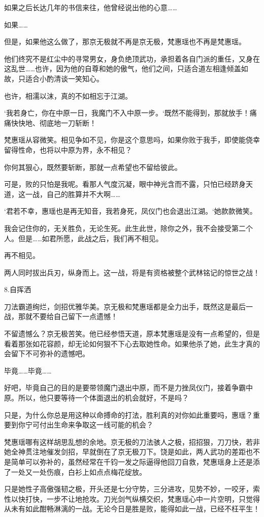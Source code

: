 如果之后长达几年的书信来往，他曾经说出他的心意……

如果……

但是，如果他这么做了，那京无极就不再是京无极，梵惠瑶也不再是梵惠瑶。

他们终究不是红尘中的寻常男女，身负绝顶武功，承担着各自门派的重任，又身在这乱世……也许，因为他的自尊和她的傲气，他们之间，只适合道左相逢倾盖如故，只适合小酌清谈一笑知心。

也许，相濡以沫，真的不如相忘于江湖。

‘我若身亡，你在中原一日，我魔门不入中原一步。‘既然不能得到，那就放手！痛痛快快地、彻底地一刀斩断！

梵惠瑶从容微笑。相见争如不见，你是这个意思吗，如果你败于我手，即使能侥幸留得性命，也将以中原为界，永不相见？

你何其狠心，既然要斩断，那就一点希望也不留给彼此。

可是，败的只怕是我呢。看那人气度沉凝，眼中神光含而不露，只怕已经跻身天道，这一战，自己的胜算并不大啊……

‘君若不幸，惠瑶也是再无知音，我若身死，凤仪门也会退出江湖。‘她款款微笑。

我会记住你的，无关胜负，无论生死。此生此世，除你之外，我不会接受第二个人。但是……如君所愿，此战之后，我们再不相见。

再不相见。

两人同时拔出兵刃，纵身而上。这一战，将是有资格被整个武林铭记的惊世之战！

8.自挥洒

刀法霸道绚烂，剑招优雅华美。京无极和梵惠瑶都是全力出手，既然这是最后一战，那就不要给自己留下一点遗憾！

不留遗憾么？京无极苦笑。他已经参悟天道，原本梵惠瑶是没有一点希望的，但是看着那张如花容颜，却无论如何狠不下心去取她性命。如果他杀了她，此生才真的会留下不可弥补的遗憾吧。

毕竟……毕竟……

好吧，毕竟自己的目的是要带领魔门退出中原，而不是力挫凤仪门，接着争霸中原。所以，他只要等待一个体面退出的机会就好，不是吗？

只是，为什么你总是用这种以命搏命的打法，胜利真的对你如此重要吗，惠瑶？重要到你宁可付出生命来争取这一线可能的机会？

梵惠瑶哪有这样胡思乱想的余地。京无极的刀法骇人之极，招招狠，刀刀快，若非她全神贯注地催发剑招，早就倒在了京无极刀下。饶是如此，两人武功的差距也不是简单可以弥补的，虽然经常在千钧一发之际逼得他回刀自救，梵惠瑶身上还是添了一处又一处伤痕，白衫上如点点梅花绽放。

只是她性子高傲强韧之极，开头还是七分守势，三分进攻，见势不妙，一咬牙，索性以快打快，一步不让地抢攻。刀光剑气纵横交织，梵惠瑶心中一片空明，只觉得从未有如此酣畅淋漓的一战。无论今日是胜是败，能得如此一战，已经不枉平生！

